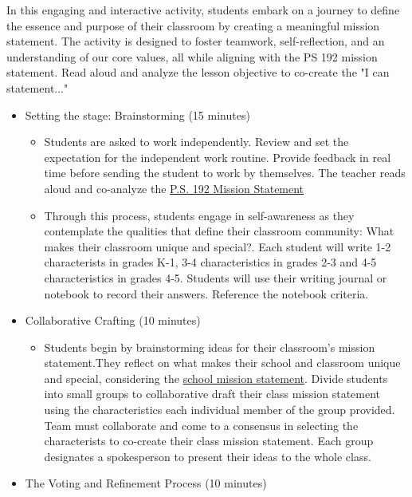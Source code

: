 \documentclass[14pt, letterpaper, twoside]{article}
\begin{document}
In this engaging and interactive activity, students embark on a journey to define the essence and purpose of their classroom by creating a meaningful mission statement. The activity is designed to foster teamwork, self-reflection, and an understanding of our core values, all while aligning with the PS 192 mission statement. Read aloud and analyze the lesson objective to co-create the "I can statement..."
\begin{itemize}
	\item Setting the stage: Brainstorming (15 minutes)
				\begin{itemize}
					\item Students are asked to work independently. Review and set the expectation for the independent work routine. Provide feedback in real time before sending the student to work by
								themselves. The teacher reads aloud and co-analyze the \href{https://www.ps192.org/apps/pages/index.jsp?uREC_ID=1504973&type=d&pREC_ID=1646782}{P.S. 192 Mission Statement}
					\item Through this process, students engage in self-awareness as they contemplate the qualities that define their classroom community: What makes their classroom unique and special?. Each student
								will write 1-2 characterists in grades K-1, 3-4 characteristics in grades 2-3 and 4-5 characteristics in grades 4-5. Students will use their writing journal or notebook to record their
								answers. Reference the notebook criteria.
				\end{itemize}
	\item Collaborative Crafting (10 minutes)
				\begin{itemize}
					\item Students begin by brainstorming ideas for their classroom's mission statement.They reflect on what makes their school and classroom unique and special, considering the
								\href{https://www.ps192.org/apps/pages/index.jsp?uREC_ID=1504973&type=d&pREC_ID=1646782}{school mission statement}. Divide students into small groups to collaborative draft their class
								mission statement using the characteristics each individual member of the group provided. Team must collaborate and come to a consensus in selecting the characterists to co-create their
								class mission statement. Each group designates a spokesperson to present their ideas to the whole class.
				\end{itemize}
	\item The Voting and Refinement Process (10 minutes)
				\begin{itemize}

\end{itemize}
\end{itemize}
\end{document}
